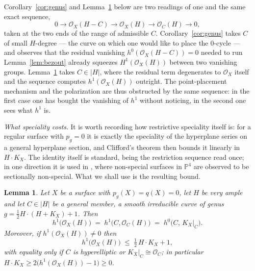 \documentclass[10pt,a4paper]{amsart}
\newtheorem{lemma}[theorem]{Lemma}
\newcommand{\OO}{\mathcal{O}}
\newcommand{\PP}{\mathbb{P}}
\begin{document}
\medskip
Corollary~\ref{cor:genus} and Lemma~\ref{lem:restriction} below are two readings of one and the same exact sequence,
\[
0\longrightarrow\OO_X(H-C)\longrightarrow\OO_X(H)\longrightarrow\OO_C(H)\longrightarrow 0 ,
\]
taken at the two ends of the range of admissible $C$. Corollary~\ref{cor:genus} takes $C$ of small $H$-degree --- the curve on which one would like to place the $0$-cycle --- and observes that the residual vanishing $h^0(\OO_X(H-C))=0$ needed to run Lemma~\ref{lem:bezout} already squeezes $H^1(\OO_X(H))$ between two vanishing groups. Lemma~\ref{lem:restriction} takes $C\in|H|$, where the residual term degenerates to $\OO_X$ itself and the sequence computes $h^1(\OO_X(H))$ outright. The point-placement mechanism and the polarization are thus obstructed by the same sequence: in the first case one has bought the vanishing of $h^1$ without noticing, in the second one sees what $h^1$ is.

\medskip
\noindent\emph{What speciality costs.} It is worth recording how restrictive speciality itself is: for a regular surface with $p_g=0$ it is exactly the speciality of the hyperplane series on a general hyperplane section, and Clifford's theorem then bounds it linearly in $H\cdot K_X$. The identity itself is standard, being the restriction sequence read once; in one direction it is used in \cite[Lem.~3.1 and Ex.~5.4]{Cas17}, where non-special surfaces in $\PP^4$ are observed to be sectionally non-special. What we shall use is the resulting bound.

\begin{lemma}\label{lem:restriction}
Let $X$ be a surface with $p_g(X)=q(X)=0$, let $H$ be very ample and let $C\in|H|$ be a general member, a smooth irreducible curve of genus $g=\tfrac12H\cdot(H+K_X)+1$. Then
\[
h^1\bigl(\OO_X(H)\bigr)\;=\;h^1\bigl(C,\OO_C(H)\bigr)\;=\;h^0\bigl(C,\,K_X|_C\bigr).
\]
Moreover, if $h^1(\OO_X(H))\neq0$ then
\[
h^1\bigl(\OO_X(H)\bigr)\;\le\;\tfrac12\,H\cdot K_X+1 ,
\]
with equality only if $C$ is hyperelliptic or $K_X|_C\cong\OO_C$; in particular $H\cdot K_X\ge2\bigl(h^1(\OO_X(H))-1\bigr)\ge0$.
\end{lemma}
\end{document}
